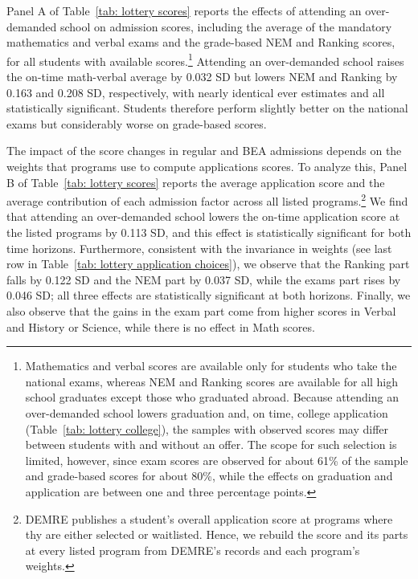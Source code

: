 Panel A of Table~\ref{tab: lottery scores} reports the effects of attending an over-demanded school on admission scores, including the average of the mandatory mathematics and verbal exams and the grade-based NEM and Ranking scores, for all students with available scores.\footnote{Mathematics and verbal scores are available only for students who take the national exams, whereas NEM and Ranking scores are available for all high school graduates except those who graduated abroad. Because attending an over-demanded school lowers graduation and, on time, college application (Table~\ref{tab: lottery college}), the samples with observed scores may differ between students with and without an offer. The scope for such selection is limited, however, since exam scores are observed for about 61\% of the sample and grade-based scores for about 80\%, while the effects on graduation and application are between one and three percentage points.}
Attending an over-demanded school raises the on-time math-verbal average by 0.032 SD but lowers NEM and Ranking by 0.163 and 0.208 SD, respectively, with nearly identical ever estimates and all statistically significant. Students therefore perform slightly better on the national exams but considerably worse on grade-based scores.




The impact of the score changes in regular and BEA admissions depends on the weights that programs use to compute applications scores. To analyze this, Panel B of Table~\ref{tab: lottery scores} reports the average application score and the average contribution of each admission factor across all listed programs.\footnote{DEMRE publishes a student's overall application score at programs where thy are either selected or waitlisted. Hence,  we rebuild the score and its parts at every listed program from DEMRE's records and each program's weights.} We find that attending an over-demanded school lowers the on-time application score at the listed programs by 0.113 SD, and this effect is statistically significant for both time horizons. Furthermore, consistent with the invariance in weights (see last row in Table~\ref{tab: lottery application choices}), we observe that the Ranking part falls by 0.122 SD and the NEM part by 0.037 SD, while the exams part rises by 0.046 SD; all three effects are statistically significant at both horizons. Finally, we also observe that the gains in the exam part come from higher scores in Verbal and History or Science, while there is no effect in Math scores. 

